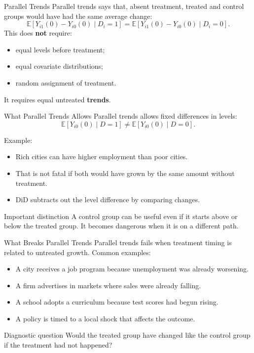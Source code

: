 \documentclass[11pt,aspectratio=169]{beamer}
\newcommand{\E}{\mathbb{E}}
\newcommand{\derivbutton}[1]{\vspace{0.4em}\hfill\hyperlink{app:#1}{\beamerbutton{Appendix details}}}
\begin{document}
\begin{frame}{Parallel Trends}
  \hypertarget{main:parallel-trends}{}
  Parallel trends says that, absent treatment, treated and control groups would have had the same average change:
  \[
    \E[Y_{i1}(0)-Y_{i0}(0)\mid D_i=1]
    =
    \E[Y_{i1}(0)-Y_{i0}(0)\mid D_i=0].
  \]
  \vspace{0.4em}
  This does \textbf{not} require:
  \begin{itemize}
    \item equal levels before treatment;
    \item equal covariate distributions;
    \item random assignment of treatment.
  \end{itemize}
  \vspace{0.2em}
  It requires equal untreated \textbf{trends}.
  \derivbutton{did-identification}
\end{frame}

\begin{frame}{What Parallel Trends Allows}
  Parallel trends allows fixed differences in levels:
  \[
    \E[Y_{i0}(0)\mid D=1]
    \neq
    \E[Y_{i0}(0)\mid D=0].
  \]

  \vspace{0.5em}
  Example:
  \begin{itemize}
    \item Rich cities can have higher employment than poor cities.
    \item That is not fatal if both would have grown by the same amount without treatment.
    \item DiD subtracts out the level difference by comparing changes.
  \end{itemize}
  \begin{block}{Important distinction}
    A control group can be useful even if it starts above or below the treated group. It becomes dangerous when it is on a different path.
  \end{block}
\end{frame}

\begin{frame}{What Breaks Parallel Trends}
  Parallel trends fails when treatment timing is related to untreated growth.
  \vspace{0.3em}
  Common examples:
  \begin{itemize}
    \item A city receives a job program because unemployment was already worsening.
    \item A firm advertises in markets where sales were already falling.
    \item A school adopts a curriculum because test scores had begun rising.
    \item A policy is timed to a local shock that affects the outcome.
  \end{itemize}
  \begin{block}{Diagnostic question}
    Would the treated group have changed like the control group if the treatment had not happened?
  \end{block}
\end{frame}
\end{document}
